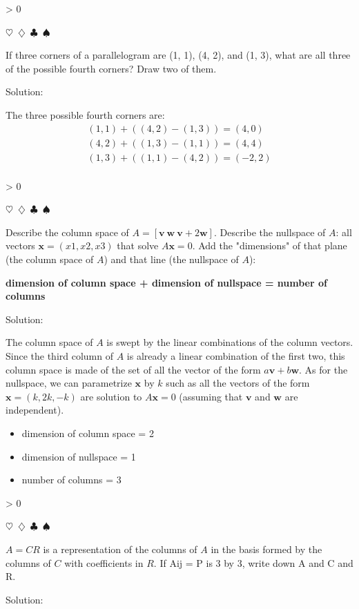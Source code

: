 \documentclass{article}
\newcommand{\sep}{\begin{center}$\heartsuit$~$\diamondsuit$~$\clubsuit$~$\spadesuit$\end{center}}
\newcommand{\sol}{\begin{center}\small{Solution:}\end{center}}
\newcommand{\vect}[1]{\ensuremath{\boldsymbol{#1}}}
\newcounter{prblm}
\newcommand{\problem}[1]{
  \begingroup
  \ifnum\value{prblm} > 0 \sep \fi
  \stepcounter{prblm}
  \noindent\textbf{\arabic{prblm}} #1
  \sol
  \endgroup
}
\begin{document}
\problem{If three corners of a parallelogram are (1, 1), (4, 2), and (1, 3), what are all three of the possible fourth corners? Draw two of them.}

The three possible fourth corners are:
\begin{gather*}
  (1,1) + ((4,2) - (1,3)) = (4,0) \\
  (4,2) + ((1,3) - (1,1)) = (4,4) \\
  (1,3) + ((1,1) - (4,2)) = (-2, 2) \\
\end{gather*}



\problem{Describe the column space of $A = [\vect{v} ~ \vect{w} ~ \vect{v} + 2\vect{w}]$. Describe the nullspace of $A$: all vectors $\vect{x} = (x1, x2, x3)$ that solve $A\vect{x} = 0$. Add the "dimensions" of that plane (the column space of $A$) and that line (the nullspace of $A$):
  \begin{center}{\textbf{dimension of column space + dimension of nullspace = number of columns}}\end{center}}

The column space of $A$ is swept by the linear combinations of the column vectors. Since the third column of $A$ is already a linear combination of the first two, this column space is made of the set of all the vector of the form $a\vect{v} + b\vect{w}$. As for the nullspace, we can parametrize $\vect{x}$ by $k$ such as all the vectors of the form $\vect{x} = (k, 2k, -k)$ are solution to $A\vect{x} = 0$ (assuming that $\vect{v}$ and $\vect{w}$ are independent).

\begin{itemize}
  \item dimension of column space = 2
  \item dimension of nullspace = 1
  \item number of columns = 3
\end{itemize}

\problem{$A = CR$ is a representation of the columns of $A$ in the basis formed by the columns of $C$ with coefficients in $R$. If Aij = P is 3 by 3, write down A and C and R.}
\end{document}
